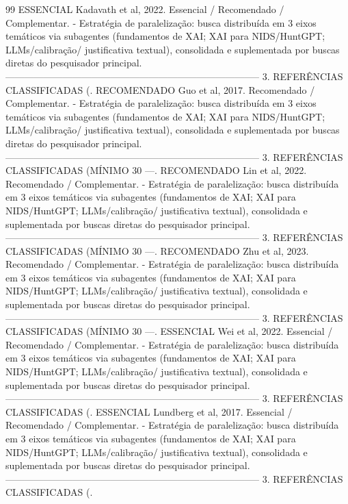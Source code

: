 \documentclass[12pt,a4paper]{article}
\begin{document}
\begin{thebibliography}{99}
 ESSENCIAL Kadavath et al, 2022. Essencial / Recomendado / Complementar. - Estratégia de paralelização: busca distribuída em 3 eixos temáticos via subagentes (fundamentos de XAI; XAI para NIDS/HuntGPT; LLMs/calibração/ justificativa textual), consolidada e suplementada por buscas diretas do pesquisador principal. -------------------------------------------------------------------------------- 3. REFERÊNCIAS CLASSIFICADAS (.
 RECOMENDADO Guo et al, 2017. Recomendado / Complementar. - Estratégia de paralelização: busca distribuída em 3 eixos temáticos via subagentes (fundamentos de XAI; XAI para NIDS/HuntGPT; LLMs/calibração/ justificativa textual), consolidada e suplementada por buscas diretas do pesquisador principal. -------------------------------------------------------------------------------- 3. REFERÊNCIAS CLASSIFICADAS (MÍNIMO 30 —.
 RECOMENDADO Lin et al, 2022. Recomendado / Complementar. - Estratégia de paralelização: busca distribuída em 3 eixos temáticos via subagentes (fundamentos de XAI; XAI para NIDS/HuntGPT; LLMs/calibração/ justificativa textual), consolidada e suplementada por buscas diretas do pesquisador principal. -------------------------------------------------------------------------------- 3. REFERÊNCIAS CLASSIFICADAS (MÍNIMO 30 —.
 RECOMENDADO Zhu et al, 2023. Recomendado / Complementar. - Estratégia de paralelização: busca distribuída em 3 eixos temáticos via subagentes (fundamentos de XAI; XAI para NIDS/HuntGPT; LLMs/calibração/ justificativa textual), consolidada e suplementada por buscas diretas do pesquisador principal. -------------------------------------------------------------------------------- 3. REFERÊNCIAS CLASSIFICADAS (MÍNIMO 30 —.
 ESSENCIAL Wei et al, 2022. Essencial / Recomendado / Complementar. - Estratégia de paralelização: busca distribuída em 3 eixos temáticos via subagentes (fundamentos de XAI; XAI para NIDS/HuntGPT; LLMs/calibração/ justificativa textual), consolidada e suplementada por buscas diretas do pesquisador principal. -------------------------------------------------------------------------------- 3. REFERÊNCIAS CLASSIFICADAS (.
 ESSENCIAL Lundberg et al, 2017. Essencial / Recomendado / Complementar. - Estratégia de paralelização: busca distribuída em 3 eixos temáticos via subagentes (fundamentos de XAI; XAI para NIDS/HuntGPT; LLMs/calibração/ justificativa textual), consolidada e suplementada por buscas diretas do pesquisador principal. -------------------------------------------------------------------------------- 3. REFERÊNCIAS CLASSIFICADAS (.

\end{thebibliography}
\end{document}
